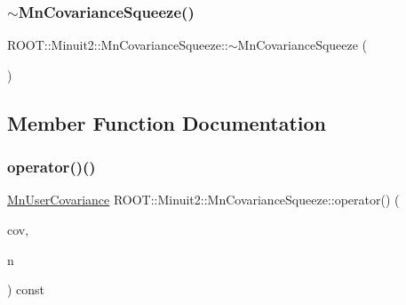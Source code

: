 \subsubsection{\texorpdfstring{$\sim$MnCovarianceSqueeze()}{~MnCovarianceSqueeze()}\hspace{0.1cm}{\footnotesize\ttfamily [2/2]}}
{\footnotesize\ttfamily R\+O\+O\+T\+::\+Minuit2\+::\+Mn\+Covariance\+Squeeze\+::$\sim$\+Mn\+Covariance\+Squeeze (\begin{DoxyParamCaption}{ }\end{DoxyParamCaption})\hspace{0.3cm}{\ttfamily [inline]}}



\subsection{Member Function Documentation}
\mbox{\label{classROOT_1_1Minuit2_1_1MnCovarianceSqueeze_af75da2b8e6e20a5477a6b0ceac4efb3a}} 
\subsubsection{\texorpdfstring{operator()()}{operator()()}\hspace{0.1cm}{\footnotesize\ttfamily [1/6]}}
{\footnotesize\ttfamily \mbox{\hyperlink{classROOT_1_1Minuit2_1_1MnUserCovariance}{Mn\+User\+Covariance}} R\+O\+O\+T\+::\+Minuit2\+::\+Mn\+Covariance\+Squeeze\+::operator() (\begin{DoxyParamCaption}\item[{const \mbox{\hyperlink{classROOT_1_1Minuit2_1_1MnUserCovariance}{Mn\+User\+Covariance}} \&}]{cov,  }\item[{unsigned int}]{n }\end{DoxyParamCaption}) const}

